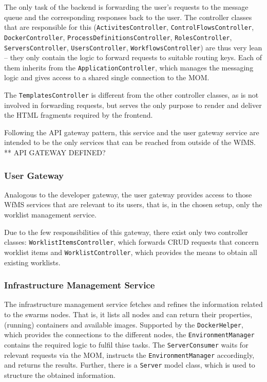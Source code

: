     The only task of the backend is forwarding the user's requests to the message queue and the corresponding responses back to the user. The controller classes that are responsible for this (\texttt{ActivitesController}, \texttt{ControlFlowsController}, \texttt{DockerController}, \texttt{ProcessDefinitionsController}, \texttt{RolesController}, \texttt{ServersController}, \texttt{UsersController}, \texttt{WorkflowsController}) are thus very lean -- they only contain the logic to forward requests to suitable routing keys. Each of them inherits from the \texttt{ApplicationController}, which manages the messaging logic and gives access to a shared single connection to the \ac{MOM}.

    The \texttt{TemplatesController} is different from the other controller classes, as is not involved in forwarding requests, but serves the only purpose to render and deliver the \ac{HTML} fragments required by the frontend.

    Following the API gateway pattern, this service and the user gateway service are intended to be the only services that can be reached from outside of the \ac{WfMS}.
    ** API GATEWAY DEFINED?


  \subsubsection{User Gateway} %
    \label{subs:user_gateway}
    Analogous to the developer gateway, the user gateway provides access to those \ac{WfMS} services that are relevant to its users, that is, in the chosen setup, only the worklist management service.

    Due to the few responsibilities of this gateway, there exist only two controller classes: \texttt{WorklistItemsController}, which forwards \ac{CRUD} requests that concern worklist items and \texttt{WorklistController}, which provides the means to obtain all existing worklists.

  \subsubsection{Infrastructure Management Service} %
    \label{subs:environment_management_service}
    The infrastructure management service fetches and refines the information related to the swarms nodes.
    That is, it lists all nodes and can return their properties, (running) containers and available images.
    Supported by the \texttt{DockerHelper}, which provides the connections to the different nodes, the \texttt{EnvironmentManager} contains the required logic to fulfil thise tasks. The \texttt{ServerConsumer} waits for relevant requests via the \ac{MOM}, instructs the \texttt{EnvironmentManager} accordingly, and returns the results. Further, there is a \texttt{Server} model class, which is used to structure the obtained information.

